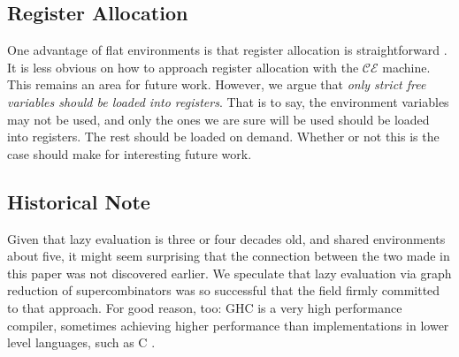 \subsection{Register Allocation} \label{sec:alloc}
One advantage of flat environments is that register allocation is
straightforward \cite{appel2006compiling, jonesstg, terei2010llvm}. It is less
obvious on how to approach register allocation with the $\mathcal{CE}$ machine.
This remains an area for future work. However, we argue that \emph{only strict
free variables should be loaded into registers}. That is to say, the environment
variables may not be used, and only the ones we are sure will be used should be
loaded into registers. The rest should be loaded on demand. Whether or not this
is the case should make for interesting future work.

\subsection{Historical Note}
Given that lazy evaluation is three or four decades old, and shared environments
about five, it might seem surprising that the connection between the two made in
this paper was not discovered earlier. We speculate that lazy evaluation via
graph reduction of supercombinators was so successful that the field firmly
committed to that approach. For good reason, too: GHC is a very high
performance compiler, sometimes achieving higher performance than
implementations in lower level languages, such as C \cite{mainland2013exploiting}. 


